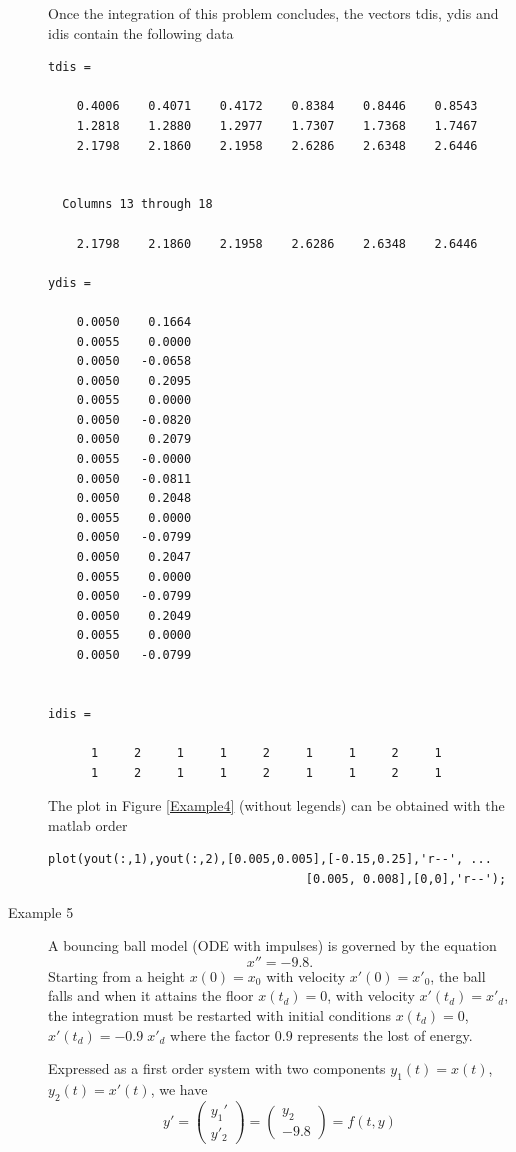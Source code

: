 \documentclass{article}
\begin{document}
\begin{description}
Once the integration of this problem concludes, the vectors tdis, ydis
and idis contain the following data

\begin{verbatim}
tdis =

    0.4006    0.4071    0.4172    0.8384    0.8446    0.8543
    1.2818    1.2880    1.2977    1.7307    1.7368    1.7467
    2.1798    2.1860    2.1958    2.6286    2.6348    2.6446


  Columns 13 through 18

    2.1798    2.1860    2.1958    2.6286    2.6348    2.6446

ydis =

    0.0050    0.1664
    0.0055    0.0000
    0.0050   -0.0658
    0.0050    0.2095
    0.0055    0.0000
    0.0050   -0.0820
    0.0050    0.2079
    0.0055   -0.0000
    0.0050   -0.0811
    0.0050    0.2048
    0.0055    0.0000
    0.0050   -0.0799
    0.0050    0.2047
    0.0055    0.0000
    0.0050   -0.0799
    0.0050    0.2049
    0.0055    0.0000
    0.0050   -0.0799


idis =

      1     2     1     1     2     1     1     2     1
      1     2     1     1     2     1     1     2     1
\end{verbatim}

The plot in Figure \ref{Example4} (without legends) can be obtained with the matlab order

\begin{verbatim}
plot(yout(:,1),yout(:,2),[0.005,0.005],[-0.15,0.25],'r--', ...
                                    [0.005, 0.008],[0,0],'r--');
\end{verbatim}

\item[Example 5]
A bouncing ball model (ODE with impulses) is governed by the equation
\[
x''=-9.8.
\]
Starting from a height $x(0)=x_0$ with velocity $x'(0)= x'_0$, the ball falls  and when it
attains the floor $x(t_d)=0$, with velocity $x'(t_d)=x'_d$,
the integration must be restarted with initial conditions $x(t_d)=0$,
$x'(t_d)=-0.9\; x'_d$ where the factor $0.9$ represents the lost of energy.

Expressed as a first order system with
two components $y_1(t)=x(t)$, $y_2(t)=x'(t)$, we have
\[
y'=\begin{pmatrix} y_1' \\y'_2 \end{pmatrix}=
\begin{pmatrix} y_2 \\ -9.8
\end{pmatrix} = f(t,y)
\]


\end{description}
\end{document}
